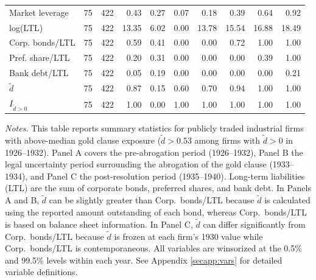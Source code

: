 \begin{table}[p]
\begin{threeparttable}
\begin{tabular}{lrrrrrrrrr}
            Market leverage & 75 & 422 & 0.43 & 0.27 & 0.07 & 0.18 & 0.39 & 0.64 & 0.92 \\
            log(LTL) & 75 & 422 & 13.35 & 6.02 & 0.00 & 13.78 & 15.54 & 16.88 & 18.49 \\
            Corp. bonds/LTL & 75 & 422 & 0.59 & 0.41 & 0.00 & 0.00 & 0.72 & 1.00 & 1.00 \\
            Pref. share/LTL & 75 & 422 & 0.20 & 0.31 & 0.00 & 0.00 & 0.00 & 0.39 & 1.00 \\
            Bank debt/LTL & 75 & 422 & 0.05 & 0.19 & 0.00 & 0.00 & 0.00 & 0.00 & 0.21 \\
            \ensuremath{\tilde{d}} & 75 & 422 & 0.87 & 0.15 & 0.60 & 0.70 & 0.94 & 1.00 & 1.00 \\
            \ensuremath{I_{\tilde{d}>0}} & 75 & 422 & 1.00 & 0.00 & 1.00 & 1.00 & 1.00 & 1.00 & 1.00 \\
            \bottomrule
        \end{tabular}
    \end{threeparttable}

    \vspace*{3mm} \justifying \noindent
\scriptsize{\textit{Notes.} This table reports summary statistics for publicly traded industrial firms with above-median gold clause exposure ($\tilde{d} > 0.53$ among firms with $\tilde{d} > 0$ in 1926--1932). Panel A covers the pre-abrogation period (1926--1932), Panel B the legal uncertainty period surrounding the abrogation of the gold clause (1933--1934), and Panel C the post-resolution period (1935--1940). Long-term liabilities (LTL) are the sum of corporate bonds, preferred shares, and bank debt. In Panels A and B, $\tilde{d}$ can be slightly greater than Corp.\ bonds/LTL because $\tilde{d}$ is calculated using the reported amount outstanding of each bond, whereas Corp.\ bonds/LTL is based on balance sheet information. In Panel C, $\tilde{d}$ can differ significantly from Corp.\ bonds/LTL because $\tilde{d}$ is frozen at each firm's 1930 value while Corp.\ bonds/LTL is contemporaneous. All variables are winsorized at the 0.5\% and 99.5\% levels within each year. See Appendix \ref{secapp:vars} for detailed variable definitions.}
\end{table}